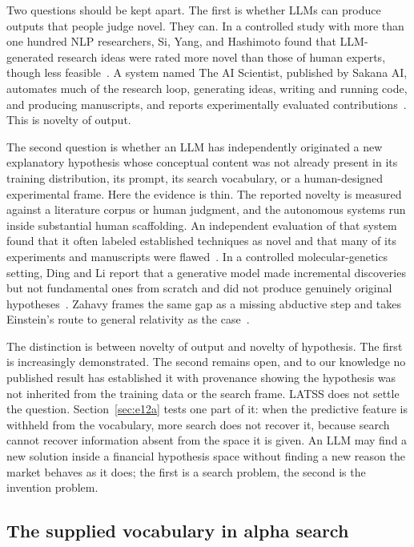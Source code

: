 \documentclass[11pt]{article}
\begin{document}
Two questions should be kept apart. The first is whether LLMs can produce outputs that people judge
novel. They can. In a controlled study with more than one hundred NLP researchers, Si, Yang, and
Hashimoto found that LLM-generated research ideas were rated more novel than those of human experts,
though less feasible~\cite{si2024}. A system named The AI Scientist, published by Sakana AI, automates
much of the research loop, generating ideas, writing and running code, and producing manuscripts, and
reports experimentally evaluated contributions~\cite{aiscientist}. This is novelty of output.

The second question is whether an LLM has independently originated a new explanatory hypothesis whose
conceptual content was not already present in its training distribution, its prompt, its search
vocabulary, or a human-designed experimental frame. Here the evidence is thin. The reported novelty is
measured against a literature corpus or human judgment, and the autonomous systems run inside
substantial human scaffolding. An independent evaluation of that system found that it often
labeled established techniques as novel and that many of its experiments and manuscripts were
flawed~\cite{aiscientisteval}. In a controlled molecular-genetics setting, Ding and Li report that a
generative model made incremental discoveries but not fundamental ones from scratch and did not
produce genuinely original hypotheses~\cite{dingli}. Zahavy frames the same gap as a missing abductive
step and takes Einstein's route to general relativity as the case~\cite{zahavy}.

The distinction is between novelty of output and novelty of hypothesis. The first is increasingly
demonstrated. The second remains open, and to our knowledge no published result has established it
with provenance showing the hypothesis was not inherited from the training data or the search frame.
LATSS does not settle the question. Section~\ref{sec:e12a} tests one part of it: when the predictive
feature is withheld from the vocabulary, more search does not recover it, because search cannot
recover information absent from the space it is given. An LLM may find a new solution inside a
financial hypothesis space without finding a new reason the market behaves as it does; the first is a
search problem, the second is the invention problem.

\subsection{The supplied vocabulary in alpha search}
\end{document}
